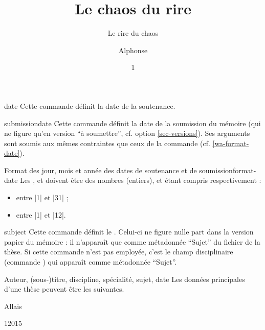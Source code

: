 %
\begin{docCommand}[doc description=\mandatory]{date}{}
  Cette commande définit la date de la soutenance.
\end{docCommand}
%
\begin{docCommand}{submissiondate}{}
  Cette commande définit la date de la soumission du mémoire (qui ne figure
  qu'en version \enquote{à soumettre}, cf. option 
  \vref{sec-versions}). Ses arguments sont soumis aux mêmes contraintes que ceux
  de la commande  (cf. \vref{wa-format-date}).
\end{docCommand}
%
\begin{dbwarning}{Format des jour, mois et année des dates de
    soutenance et de soumission}{format-date}
  Les ,  et  doivent être des nombres
  (entiers),  et  étant compris respectivement :
  \begin{itemize}
  \item entre |1| et |31| ;
  \item entre |1| et |12|.
  \end{itemize}
\end{dbwarning}
%
\begin{docCommand}{subject}{}
  Cette commande définit le .  Celui-ci ne figure nulle
  part dans la version papier du mémoire : il n'apparaît que comme métadonnée
  \enquote{Sujet} du fichier \pdf{} de la thèse. Si cette commande n'est pas
  employée, c'est le champ disciplinaire (commande ) qui
  apparaît comme métadonnée \enquote{Sujet}.
\end{docCommand}

\begin{dbexample}{Auteur, (sous-)titre, discipline, spécialité, sujet, date}{}
  Les données principales d'une thèse peuvent être les suivantes.
  \NoAutoSpacing%
\begin{preamblecode}[title=Par exemple dans le \File{\characteristicsfile},listing options={deletekeywords={author,title,subtitle,date},deletekeywords={[2]title},deletekeywords={[5]academicfield,speciality}}]
\author[aa@zygo.fr]{Alphonse}{Allais}
\title[Laugh's Chaos]{Le chaos du rire}
\subtitle[Chaos' laugh]{Le rire du chaos}
\date{1}{1}{2015}
\subject{Rire chaotique}
\end{preamblecode}
\end{dbexample}


